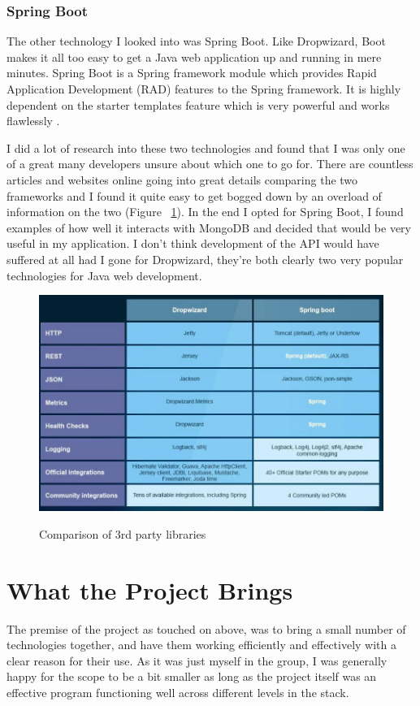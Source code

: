 \subsubsection{Spring Boot}
The other technology I looked into was Spring Boot. Like Dropwizard, Boot makes it all too easy to get a Java web application up and running in mere minutes. Spring Boot is a Spring framework module which provides Rapid Application Development (RAD) features to the Spring framework. It is highly dependent on the starter templates feature which is very powerful and works flawlessly \cite{boot:howto}.

I did a lot of research into these two technologies and found that I was only one of a great many developers unsure about which one to go for. There are countless articles and websites online going into great details comparing the two frameworks and I found it quite easy to get bogged down by an overload of information on the two (Figure ~\ref{drop_label}). In the end I opted for Spring Boot, I found examples of how well it interacts with MongoDB and decided that would be very useful in my application. I don't think development of the API would have suffered at all had I gone for Dropwizard, they're both clearly two very popular technologies for Java web development.

\begin{figure}[h]
    \centering
    \includegraphics[scale=0.3]{Images/dropwizard.jpeg} 
    \label{drop_label}
    \caption{Comparison of 3rd party libraries}
\end{figure}

\section{What the Project Brings}
The premise of the project as touched on above, was to bring a small number of technologies together, and have them working efficiently and effectively with a clear reason for their use. As it was just myself in the group, I was generally happy for the scope to be a bit smaller as long as the project itself was an effective program functioning well across different levels in the stack.

